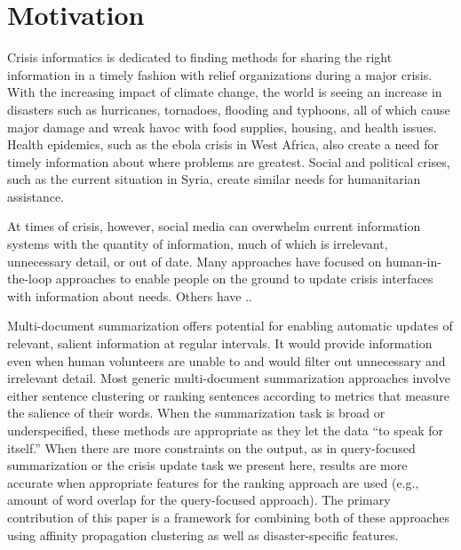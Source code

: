 \section{Motivation}


Crisis informatics\cite{?} is dedicated to finding methods for sharing the
right information in a timely fashion with relief organizations during a major crisis. With the
increasing impact of climate change, the world is seeing an increase in
disasters such as hurricanes, tornadoes, flooding and typhoons, all of which
cause major damage and wreak havoc with food supplies, housing, and health
issues. Health epidemics, such as the ebola crisis in West Africa, also create
a need for timely information about where problems are greatest. Social and
political 
crises, such as the current situation in Syria, create similar needs for
humanitarian assistance.

At times of crisis, however, social media can overwhelm current information
systems with the quantity of information, much of which is irrelevant,
unnecessary detail, or out of date. Many approaches have focused on
human-in-the-loop approaches \cite{?} to enable people on the ground to update
crisis interfaces with information about needs. Others have ..








Multi-document summarization offers potential for enabling automatic updates of
relevant, salient information at regular intervals. It would provide
information even when human volunteers are unable to and would filter out
unnecessary and irrelevant detail. 
Most generic multi-document summarization approaches involve either sentence 
clustering or ranking sentences according to metrics that measure the salience
of their words. 
When the summarization task
is broad or underspecified,
these methods are appropriate as they let the data
``to speak for itself.''
When there are more constraints on the output, as in query-focused
summarization or the crisis update task we present here,
results are more accurate when
appropriate features for the ranking approach are used (e.g., amount of word
overlap for the query-focused approach).
The primary contribution of this paper
is a framework for combining both of these approaches using affinity
propagation clustering as well as disaster-specific features.


